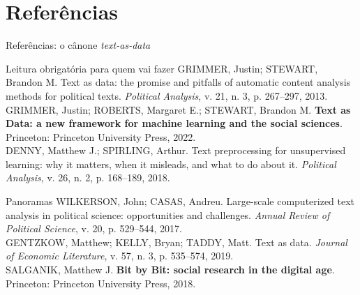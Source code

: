 \documentclass[11pt,aspectratio=169]{beamer}
\begin{document}
\section*{Referências}

\begin{frame}{Referências: o cânone \emph{text-as-data}}
\scriptsize
\begin{block}{Leitura obrigatória para quem vai fazer}
GRIMMER, Justin; STEWART, Brandon M. Text as data: the promise and pitfalls of
automatic content analysis methods for political texts. \textit{Political
Analysis}, v. 21, n. 3, p. 267--297, 2013.\\[2pt]
GRIMMER, Justin; ROBERTS, Margaret E.; STEWART, Brandon M. \textbf{Text as Data:
a new framework for machine learning and the social sciences}. Princeton:
Princeton University Press, 2022.\\[2pt]
DENNY, Matthew J.; SPIRLING, Arthur. Text preprocessing for unsupervised
learning: why it matters, when it misleads, and what to do about it.
\textit{Political Analysis}, v. 26, n. 2, p. 168--189, 2018.
\end{block}
\begin{block}{Panoramas}
WILKERSON, John; CASAS, Andreu. Large-scale computerized text analysis in
political science: opportunities and challenges. \textit{Annual Review of
Political Science}, v. 20, p. 529--544, 2017.\\[2pt]
GENTZKOW, Matthew; KELLY, Bryan; TADDY, Matt. Text as data. \textit{Journal of
Economic Literature}, v. 57, n. 3, p. 535--574, 2019.\\[2pt]
SALGANIK, Matthew J. \textbf{Bit by Bit: social research in the digital age}.
Princeton: Princeton University Press, 2018.
\end{block}
\end{frame}
\end{document}

